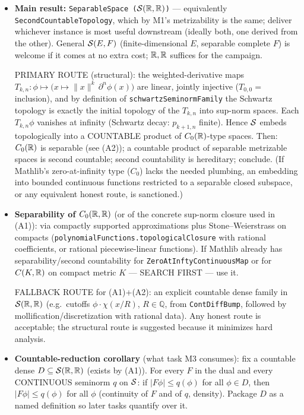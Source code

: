 \documentclass[11pt]{article}
\theoremstyle{plain}
\theoremstyle{remark}
\begin{document}
\begin{itemize}
\item[(A1)] \textbf{Main result:}
\texttt{SeparableSpace ($\mathcal{S}(\mathbb{R},\mathbb{R})$)} --- equivalently
\texttt{SecondCountableTopology}, which by M1's metrizability is the same;
deliver whichever instance is most useful downstream (ideally both, one
derived from the other). General $\mathcal{S}(E,F)$ (finite-dimensional $E$,
separable complete $F$) is welcome if it comes at no extra cost; $\mathbb{R},\mathbb{R}$
suffices for the campaign.

PRIMARY ROUTE (structural): the weighted-derivative maps
$T_{k,n}:\phi\mapsto\big(x\mapsto\|x\|^k\,\partial^n\phi(x)\big)$ are
linear, jointly injective ($T_{0,0}=$ inclusion), and by definition of
\texttt{schwartzSeminormFamily} the Schwartz topology is exactly the
initial topology of the $T_{k,n}$ into sup-norm spaces. Each $T_{k,n}\phi$
vanishes at infinity (Schwartz decay: $p_{k+1,n}$ finite). Hence $\mathcal{S}$
embeds topologically into a COUNTABLE product of $C_0(\mathbb{R})$-type spaces.
Then: $C_0(\mathbb{R})$ is separable (see (A2)); a countable product of separable
metrizable spaces is second countable; second countability is hereditary;
conclude. (If Mathlib's zero-at-infinity type ($C_0$) lacks the needed
plumbing, an embedding into bounded continuous functions restricted to a
separable closed subspace, or any equivalent honest route, is sanctioned.)
\item[(A2)] \textbf{Separability of $C_0(\mathbb{R},\mathbb{R})$} (or of the concrete
sup-norm closure used in (A1)): via compactly supported approximations plus
Stone--Weierstrass on compacts
(\texttt{polynomialFunctions.topologicalClosure} with rational
coefficients, or rational piecewise-linear functions). If Mathlib already
has separability/second countability for \texttt{ZeroAtInftyContinuousMap}
or for $C(K,\mathbb{R})$ on compact metric $K$ --- SEARCH FIRST --- use it.

FALLBACK ROUTE for (A1)+(A2): an explicit countable dense family in
$\mathcal{S}(\mathbb{R},\mathbb{R})$ (e.g.\ cutoffs $\phi\cdot\chi(x/R)$, $R\in\mathbb Q$, from
\texttt{ContDiffBump}, followed by mollification/discretization with
rational data). Any honest route is acceptable; the structural route is
suggested because it minimizes hard analysis.
\item[(A3)] \textbf{Countable-reduction corollary} (what task M3 consumes):
fix a countable dense $D\subseteq\mathcal{S}(\mathbb{R},\mathbb{R})$ (exists by (A1)). For every
$F$ in the dual and every CONTINUOUS seminorm $q$ on $\mathcal{S}$:
if $|F\phi|\le q(\phi)$ for all $\phi\in D$, then $|F\phi|\le q(\phi)$ for
all $\phi$ (continuity of $F$ and of $q$, density). Package $D$ as a named
definition so later tasks quantify over it.
\end{itemize}
\end{document}

